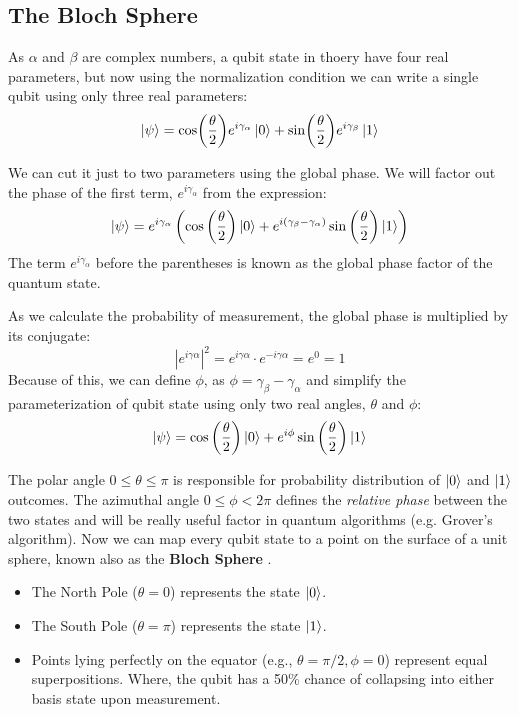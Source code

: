 \subsection{The Bloch Sphere}

As $\alpha$ and $\beta$ are complex numbers, a qubit state in thoery have four real parameters, but now using 
the normalization condition we can write a single qubit using only three real parameters:
%
%
\bigskip
\begin{equation}
    \ket{\psi} = \cos(\frac{\theta}{2})e^{i\gamma_\alpha}\ket{0} + \sin(\frac{\theta}{2})e^{i\gamma_\beta}\ket{1}
\end{equation}
\bigskip
%
%

We can cut it just to two parameters using the global phase. We will factor out the phase of the first term, $e^{i\gamma_\alpha}$ 
from the expression:
\bigskip
\begin{equation}
    \ket{\psi} = e^{i\gamma_\alpha} \left( \cos\left(\frac{\theta}{2}\right)\ket{0} + e^{i(\gamma_\beta - \gamma_\alpha)}\sin\left(\frac{\theta}{2}\right)\ket{1} \right)
\end{equation}
\bigskip
The term $e^{i\gamma_\alpha}$ before the parentheses is known as the global phase factor of the quantum state.
%
%

As we calculate the probability of measurement, the global phase is multiplied by its conjugate:
%
%
\bigskip
\begin{equation}
    |e^{i\gamma \alpha}|^2 = e^{i\gamma \alpha} \cdot e^{-i\gamma \alpha} = e^0 = 1
\end{equation}
\bigskip
%
%
Because of this, we can define $\phi$, as $\phi = \gamma_\beta - \gamma_\alpha$ and simplify the parameterization of qubit state 
using only two real angles, $\theta$ and $\phi$:
%
%
\bigskip
\begin{equation}
    \ket{\psi} = \cos\left(\frac{\theta}{2}\right)\ket{0} + e^{i\phi}\sin\left(\frac{\theta}{2}\right)\ket{1}
\end{equation}
\bigskip
%
%

The polar angle $0 \leq \theta \leq \pi$ is responsible for probability distribution of $\ket{0}$ and $\ket{1}$ outcomes.
The azimuthal angle $0 \leq \phi < 2\pi$ defines the \textit{relative phase} between the two states and will be really useful 
factor in quantum algorithms (e.g. Grover's algorithm).
%
%
Now we can map every qubit state to a point on the surface of a unit sphere, known also as the \textbf{Bloch Sphere} \cite{nielsen2010quantum}.
\begin{itemize}
    \item The North Pole ($\theta = 0$) represents the state $\ket{0}$.
    \item The South Pole ($\theta = \pi$) represents the state $\ket{1}$.
    \item Points lying perfectly on the equator (e.g., $\theta = \pi/2, \phi = 0$) represent equal superpositions.
    Where, the qubit has a 50\% chance of collapsing into either basis state upon measurement.
\end{itemize}
%
%

